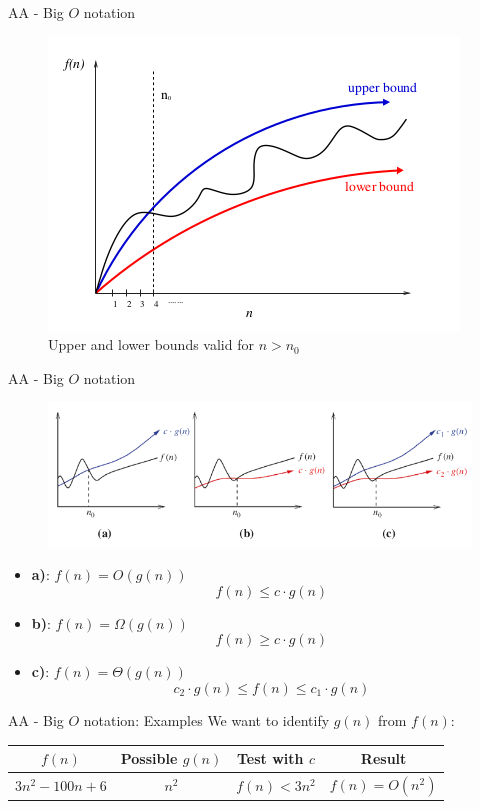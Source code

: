 \documentclass{beamer}
\begin{document}
\begin{frame}{AA - Big $O$ notation}
    \begin{figure}
        \centering
        \includegraphics[scale=0.5]{imgs/1-CompetitiveProgramming/big-O-notation.png}
        \caption{Upper and lower bounds valid for $n>n_0$}
        \label{fig:my_label}
    \end{figure}
\end{frame}

\begin{frame}{AA - Big $O$ notation}
    \begin{figure}
        \centering
        \includegraphics[scale=0.4]{imgs/1-CompetitiveProgramming/big-O-comparison.png}
        \label{fig:my_label}
    \end{figure}
    \begin{itemize}
        \item \textbf{a)}: $f(n) = O(g(n))$ $$f(n) \leq c\cdot g(n)$$
        \item \textbf{b)}: $f(n) = \Omega(g(n))$  $$f(n) \geq c\cdot g(n)$$
        \item \textbf{c)}: $f(n) = \Theta(g(n))$  $$c_2\cdot g(n) \leq f(n) \leq c_1\cdot g(n)$$
    \end{itemize}
\end{frame}

\begin{frame}{AA - Big $O$ notation: Examples}
    We want to identify $g(n)$ from $f(n)$:
    \begin{table}[H]
        \centering
        \begin{tabular}{|c|c|c|c|}
            \hline
            $f(n)$ & Possible $g(n)$ & Test with $c$ & Result \\ \hline
            $3n^2-100n+6$ & $n^2$ & $f(n) < 3n^2$ & $f(n) = O(n^2)$ \\ \hline
        \end{tabular}
    \end{table}
\end{frame}
\end{document}
